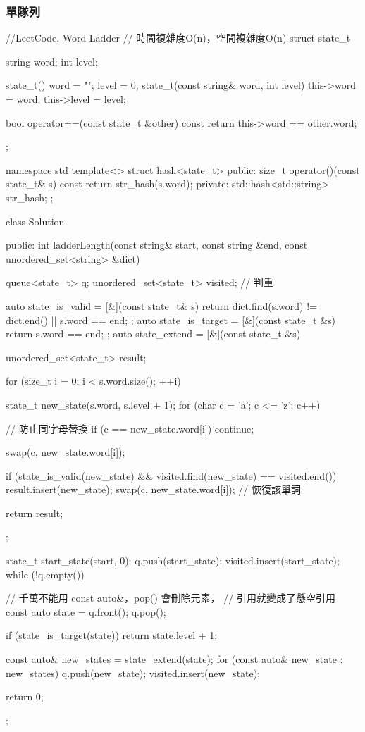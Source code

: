 \subsubsection{單隊列}
\begin{Code}
//LeetCode, Word Ladder
// 時間複雜度O(n)，空間複雜度O(n)
struct state_t {
    string word;
    int level;

    state_t() { word = ""; level = 0; }
    state_t(const string& word, int level) {
        this->word = word;
        this->level = level;
    }

    bool operator==(const state_t &other) const {
        return this->word == other.word;
    }
};

namespace std {
    template<> struct hash<state_t> {
    public:
        size_t operator()(const state_t& s) const {
            return str_hash(s.word);
        }
    private:
        std::hash<std::string> str_hash;
    };
}


class Solution {
public:
    int ladderLength(const string& start, const string &end,
            const unordered_set<string> &dict) {
        queue<state_t> q;
        unordered_set<state_t> visited;  // 判重

        auto state_is_valid = [&](const state_t& s) {
            return dict.find(s.word) != dict.end() || s.word == end;
        };
        auto state_is_target = [&](const state_t &s) {return s.word == end; };
        auto state_extend = [&](const state_t &s) {
            unordered_set<state_t> result;

            for (size_t i = 0; i < s.word.size(); ++i) {
                state_t new_state(s.word, s.level + 1);
                for (char c = 'a'; c <= 'z'; c++) {
                    // 防止同字母替換
                    if (c == new_state.word[i]) continue;

                    swap(c, new_state.word[i]);

                    if (state_is_valid(new_state) &&
                        visited.find(new_state) == visited.end()) {
                        result.insert(new_state);
                    }
                    swap(c, new_state.word[i]); // 恢復該單詞
                }
            }

            return result;
        };

        state_t start_state(start, 0);
        q.push(start_state);
        visited.insert(start_state);
        while (!q.empty()) {
            // 千萬不能用 const auto&，pop() 會刪除元素，
            // 引用就變成了懸空引用
            const auto state = q.front();
            q.pop();

            if (state_is_target(state)) {
                return state.level + 1;
            }

            const auto& new_states = state_extend(state);
            for (const auto& new_state : new_states) {
                q.push(new_state);
                visited.insert(new_state);
            }
        }
        return 0;
    }
};
\end{Code}


